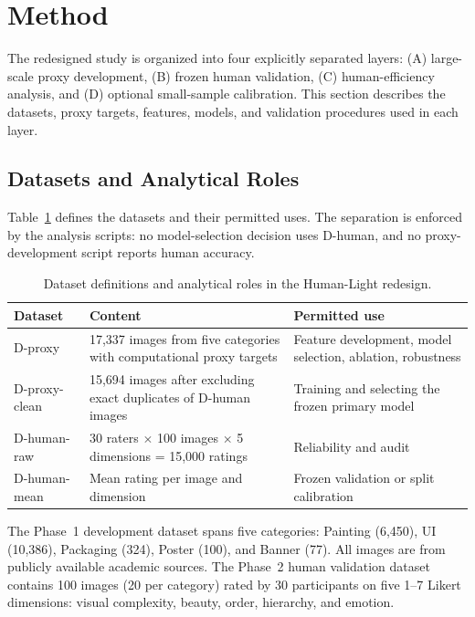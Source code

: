 
\section{Method}
\label{sec:method}

The redesigned study is organized into four explicitly separated layers: (A) large-scale proxy development, (B) frozen human validation, (C) human-efficiency analysis, and (D) optional small-sample calibration. This section describes the datasets, proxy targets, features, models, and validation procedures used in each layer.

\subsection{Datasets and Analytical Roles}
\label{sec:datasets}

Table~\ref{tab:dataset_roles} defines the datasets and their permitted uses. The separation is enforced by the analysis scripts: no model-selection decision uses D-human, and no proxy-development script reports human accuracy.

\begin{table}[htbp]
\centering
\caption{Dataset definitions and analytical roles in the Human-Light redesign.}
\label{tab:dataset_roles}
\begin{tabular}{@{}lp{5.5cm}p{5.5cm}@{}}
\toprule
Dataset & Content & Permitted use \\
\midrule
D-proxy & 17,337 images from five categories with computational proxy targets & Feature development, model selection, ablation, robustness \\
D-proxy-clean & 15,694 images after excluding exact duplicates of D-human images & Training and selecting the frozen primary model \\
D-human-raw & 30 raters $\times$ 100 images $\times$ 5 dimensions = 15,000 ratings & Reliability and audit \\
D-human-mean & Mean rating per image and dimension & Frozen validation or split calibration \\
\bottomrule
\end{tabular}
\end{table}

The Phase~1 development dataset spans five categories: Painting (6,450), UI (10,386), Packaging (324), Poster (100), and Banner (77). All images are from publicly available academic sources. The Phase~2 human validation dataset contains 100 images (20 per category) rated by 30 participants on five 1--7 Likert dimensions: visual complexity, beauty, order, hierarchy, and emotion.

